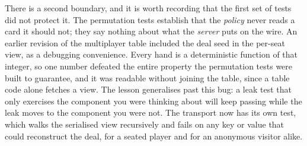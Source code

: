 \documentclass[11pt,letterpaper]{article}
\begin{document}
There is a second boundary, and it is worth recording that the first set of
tests did not protect it. The permutation tests establish that the
\emph{policy} never reads a card it should not; they say nothing about what the
\emph{server} puts on the wire. An earlier revision of the multiplayer table
included the deal seed in the per-seat view, as a debugging convenience. Every
hand is a deterministic function of that integer, so one number defeated the
entire property the permutation tests were built to guarantee, and it was
readable without joining the table, since a table code alone fetches a view.
The lesson generalises past this bug: a leak test that only exercises the
component you were thinking about will keep passing while the leak moves to the
component you were not. The transport now has its own test, which walks the
serialised view recursively and fails on any key or value that could reconstruct
the deal, for a seated player and for an anonymous visitor alike.
\end{document}
